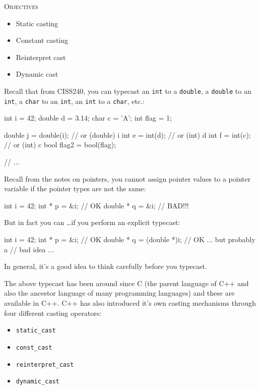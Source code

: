 \newpage{}

\textsc{Objectives}

\begin{itemize}
\item
  Static casting
\item
  Constant casting
\item
  Reinterpret cast
\item
  Dynamic cast
\end{itemize}

\newpage{}

Recall that from CISS240, you can typecast an \texttt{int} to a \texttt{double}, a \texttt{double} to an \texttt{int}, a \texttt{char} to an \texttt{int}, an \texttt{int} to a \texttt{char}, etc.:
\begin{console}
int i = 42;
double d = 3.14;
char c = 'A';
int flag = 1;

double j = double(i); // or (double) i
int e = int(d); // or (int) d
int f = int(c); // or (int) c
bool flag2 = bool(flag);

// ...
\end{console}

Recall from the notes on pointers, you cannot assign pointer values to a
pointer variable if the pointer types are not the same:
\begin{console}
int i = 42;
int * p = &i; // OK
double * q = &i; // BAD!!!
\end{console}

But in fact you can \ldots if you perform an explicit typecast:
\begin{console}
int i = 42;
int * p = &i; // OK
double * q = (double *)i; // OK ... but probably a
                          // bad idea ...
\end{console}
In general, it's a good idea to think carefully before you typecast.

The above typecast has been around since C (the parent language of C++
and also the ancestor language of many programming languages) and these
are available in C++. C++ has also introduced it's own casting
mechanisms through four different casting operators:

\begin{itemize}
\item
  \verb!static_cast!
\item
  \verb!const_cast!
\item
  \verb!reinterpret_cast!
\item
  \verb!dynamic_cast!
\end{itemize}

